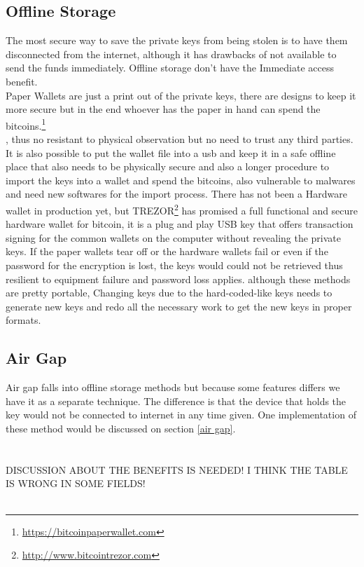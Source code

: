 \subsection{Offline Storage}
\label{sec:offline storage}
The most secure way to save the private keys from being stolen is to have them disconnected from the internet, although it has drawbacks of not available to send the funds immediately. Offline storage don't have the Immediate access benefit.\\
Paper Wallets are just a print out of the private keys, there are designs to keep it more secure but in the end whoever has the paper in hand can spend the bitcoins.\footnote{\url {https://bitcoinpaperwallet.com}}\\, thus no resistant to physical observation but no need to trust any third parties.
It is also possible to put the wallet file into a usb and keep it in a safe offline place that also needs to be physically secure and also a longer procedure to import the keys into a wallet and spend the bitcoins, also vulnerable to malwares and need new softwares for the import process. There has not been a Hardware wallet in production yet, but TREZOR\footnote{\url {http://www.bitcointrezor.com}} has promised a full functional and secure hardware wallet for bitcoin, it is a plug and play USB key that offers transaction signing for the common wallets on the computer without revealing the private keys. If the paper wallets tear off or the hardware wallets fail or even if the password for the encryption is lost, the keys would could not be retrieved thus resilient to equipment failure and password loss applies. although these methods are pretty portable, Changing keys due to the hard-coded-like keys needs to generate new keys and redo all the necessary work to get the new keys in proper formats.

\subsection{Air Gap}
Air gap falls into offline storage methods but because some features differs we have it as a separate technique. The difference is that the device that holds the key would not be connected to internet in any time given. One implementation of these method would be discussed on section \ref{air gap}. \\ \\ \\ DISCUSSION ABOUT THE BENEFITS IS NEEDED! I THINK THE TABLE IS WRONG IN SOME FIELDS! \\ \\ 


